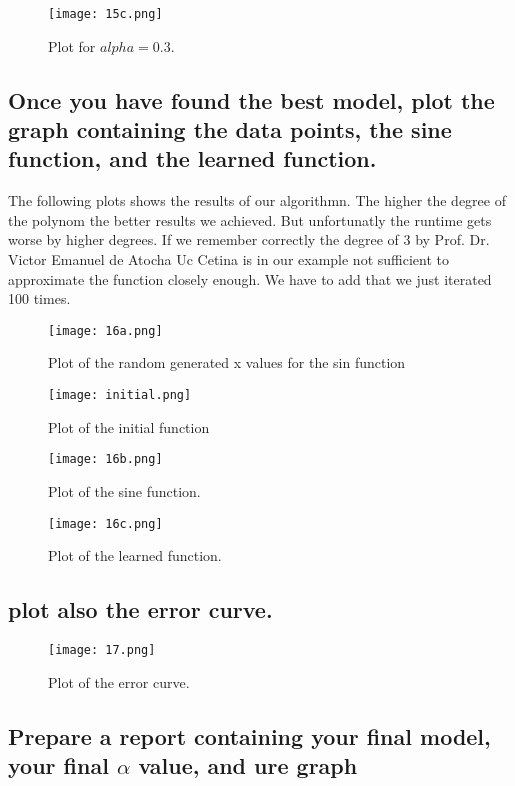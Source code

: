 \documentclass[11pt]{article}
\begin{document}
\begin{figure}[ht]
          \centering
          \texttt{[image: 15c.png]}
          \caption{Plot for $alpha=0.3$.}
          \label{15bplot}
      \end{figure}

\subsection{Once you have found the best model, plot the graph containing the data points, the sine function, and the learned function.}

The following plots shows the results of our algorithmn. The higher the degree of the polynom the better results we achieved. But unfortunatly the runtime gets worse by higher degrees. If we remember correctly the degree of 3 by Prof. Dr. Victor Emanuel de Atocha Uc Cetina is in our example not sufficient to approximate the function closely enough. We have to add that we just iterated 100 times. 
\begin{figure}[ht]
    \centering
    \texttt{[image: 16a.png]}
    \caption{Plot of the random generated x values for the sin function}
    \label{16aplot}
\end{figure}
\begin{figure}[ht]
      \centering
      \texttt{[image: initial.png]}
      \caption{Plot of the initial function}
  \end{figure}

\begin{figure}[ht]
    \centering
    \texttt{[image: 16b.png]}
    \caption{Plot of the sine function.}
    \label{16bplot}
\end{figure}
\begin{figure}[ht]
    \centering
    \texttt{[image: 16c.png]}
    \caption{Plot of the learned function.}
    \label{16cplot}
\end{figure}

\newpage
\subsection{plot also the error curve.}
\begin{figure}[ht]
    \centering
    \texttt{[image: 17.png]}
    \caption{Plot of the error curve.}
    \label{17plot}
\end{figure}

\subsection{Prepare a report containing your final model, your final $\alpha$ value, and ure graph}
\end{document}
